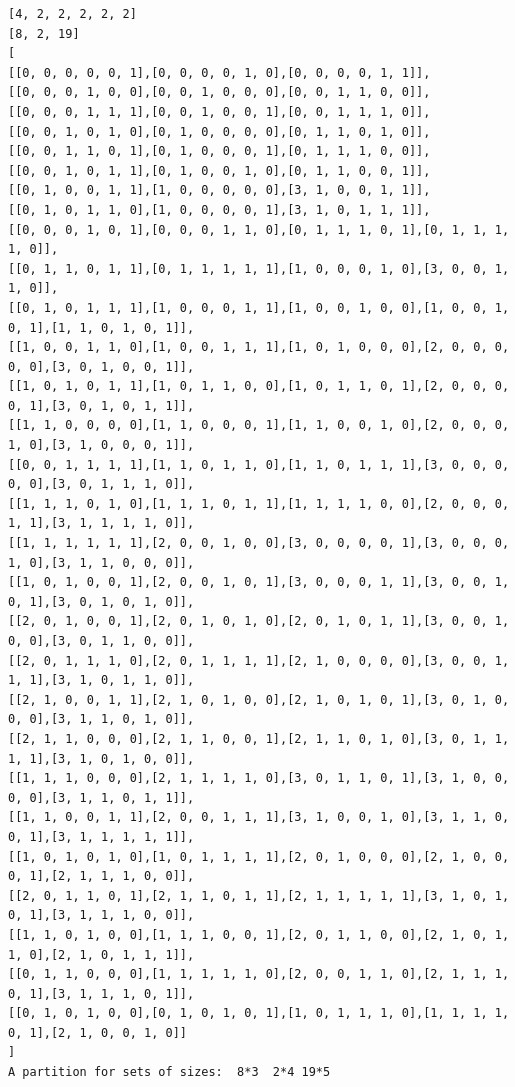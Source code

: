 \documentclass[final]{dmtcs-episciences}
\begin{document}
\begin{appendices}
\begin{verbatim} 
[4, 2, 2, 2, 2, 2]
[8, 2, 19]
[
[[0, 0, 0, 0, 0, 1],[0, 0, 0, 0, 1, 0],[0, 0, 0, 0, 1, 1]],
[[0, 0, 0, 1, 0, 0],[0, 0, 1, 0, 0, 0],[0, 0, 1, 1, 0, 0]],
[[0, 0, 0, 1, 1, 1],[0, 0, 1, 0, 0, 1],[0, 0, 1, 1, 1, 0]],
[[0, 0, 1, 0, 1, 0],[0, 1, 0, 0, 0, 0],[0, 1, 1, 0, 1, 0]],
[[0, 0, 1, 1, 0, 1],[0, 1, 0, 0, 0, 1],[0, 1, 1, 1, 0, 0]],
[[0, 0, 1, 0, 1, 1],[0, 1, 0, 0, 1, 0],[0, 1, 1, 0, 0, 1]],
[[0, 1, 0, 0, 1, 1],[1, 0, 0, 0, 0, 0],[3, 1, 0, 0, 1, 1]],
[[0, 1, 0, 1, 1, 0],[1, 0, 0, 0, 0, 1],[3, 1, 0, 1, 1, 1]],
[[0, 0, 0, 1, 0, 1],[0, 0, 0, 1, 1, 0],[0, 1, 1, 1, 0, 1],[0, 1, 1, 1, 1, 0]],
[[0, 1, 1, 0, 1, 1],[0, 1, 1, 1, 1, 1],[1, 0, 0, 0, 1, 0],[3, 0, 0, 1, 1, 0]],
[[0, 1, 0, 1, 1, 1],[1, 0, 0, 0, 1, 1],[1, 0, 0, 1, 0, 0],[1, 0, 0, 1, 0, 1],[1, 1, 0, 1, 0, 1]],
[[1, 0, 0, 1, 1, 0],[1, 0, 0, 1, 1, 1],[1, 0, 1, 0, 0, 0],[2, 0, 0, 0, 0, 0],[3, 0, 1, 0, 0, 1]],
[[1, 0, 1, 0, 1, 1],[1, 0, 1, 1, 0, 0],[1, 0, 1, 1, 0, 1],[2, 0, 0, 0, 0, 1],[3, 0, 1, 0, 1, 1]],
[[1, 1, 0, 0, 0, 0],[1, 1, 0, 0, 0, 1],[1, 1, 0, 0, 1, 0],[2, 0, 0, 0, 1, 0],[3, 1, 0, 0, 0, 1]],
[[0, 0, 1, 1, 1, 1],[1, 1, 0, 1, 1, 0],[1, 1, 0, 1, 1, 1],[3, 0, 0, 0, 0, 0],[3, 0, 1, 1, 1, 0]],
[[1, 1, 1, 0, 1, 0],[1, 1, 1, 0, 1, 1],[1, 1, 1, 1, 0, 0],[2, 0, 0, 0, 1, 1],[3, 1, 1, 1, 1, 0]],
[[1, 1, 1, 1, 1, 1],[2, 0, 0, 1, 0, 0],[3, 0, 0, 0, 0, 1],[3, 0, 0, 0, 1, 0],[3, 1, 1, 0, 0, 0]],
[[1, 0, 1, 0, 0, 1],[2, 0, 0, 1, 0, 1],[3, 0, 0, 0, 1, 1],[3, 0, 0, 1, 0, 1],[3, 0, 1, 0, 1, 0]],
[[2, 0, 1, 0, 0, 1],[2, 0, 1, 0, 1, 0],[2, 0, 1, 0, 1, 1],[3, 0, 0, 1, 0, 0],[3, 0, 1, 1, 0, 0]],
[[2, 0, 1, 1, 1, 0],[2, 0, 1, 1, 1, 1],[2, 1, 0, 0, 0, 0],[3, 0, 0, 1, 1, 1],[3, 1, 0, 1, 1, 0]],
[[2, 1, 0, 0, 1, 1],[2, 1, 0, 1, 0, 0],[2, 1, 0, 1, 0, 1],[3, 0, 1, 0, 0, 0],[3, 1, 1, 0, 1, 0]],
[[2, 1, 1, 0, 0, 0],[2, 1, 1, 0, 0, 1],[2, 1, 1, 0, 1, 0],[3, 0, 1, 1, 1, 1],[3, 1, 0, 1, 0, 0]],
[[1, 1, 1, 0, 0, 0],[2, 1, 1, 1, 1, 0],[3, 0, 1, 1, 0, 1],[3, 1, 0, 0, 0, 0],[3, 1, 1, 0, 1, 1]],
[[1, 1, 0, 0, 1, 1],[2, 0, 0, 1, 1, 1],[3, 1, 0, 0, 1, 0],[3, 1, 1, 0, 0, 1],[3, 1, 1, 1, 1, 1]],
[[1, 0, 1, 0, 1, 0],[1, 0, 1, 1, 1, 1],[2, 0, 1, 0, 0, 0],[2, 1, 0, 0, 0, 1],[2, 1, 1, 1, 0, 0]],
[[2, 0, 1, 1, 0, 1],[2, 1, 1, 0, 1, 1],[2, 1, 1, 1, 1, 1],[3, 1, 0, 1, 0, 1],[3, 1, 1, 1, 0, 0]],
[[1, 1, 0, 1, 0, 0],[1, 1, 1, 0, 0, 1],[2, 0, 1, 1, 0, 0],[2, 1, 0, 1, 1, 0],[2, 1, 0, 1, 1, 1]],
[[0, 1, 1, 0, 0, 0],[1, 1, 1, 1, 1, 0],[2, 0, 0, 1, 1, 0],[2, 1, 1, 1, 0, 1],[3, 1, 1, 1, 0, 1]],
[[0, 1, 0, 1, 0, 0],[0, 1, 0, 1, 0, 1],[1, 0, 1, 1, 1, 0],[1, 1, 1, 1, 0, 1],[2, 1, 0, 0, 1, 0]]
]
A partition for sets of sizes:  8*3  2*4 19*5
\end{verbatim}
\newpage


\end{appendices}
\end{document}
